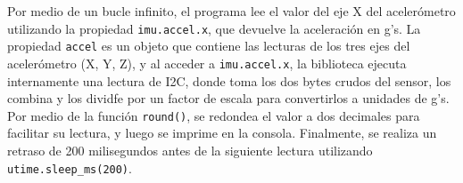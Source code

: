 \documentclass[letterpaper,12pt]{article}
\begin{document}
    Por medio de un bucle infinito, el programa lee el valor del eje X del acelerómetro utilizando la propiedad \texttt{imu.accel.x}, que devuelve la aceleración en g's. La propiedad \texttt{accel} es un objeto que contiene las lecturas de los tres ejes del acelerómetro (X, Y, Z), y al acceder a \texttt{imu.accel.x}, la biblioteca ejecuta internamente una lectura de I2C, donde toma los dos bytes crudos del sensor, los combina y los dividfe por un factor de escala para convertirlos a unidades de g's. Por medio de la función \texttt{round()}, se redondea el valor a dos decimales para facilitar su lectura, y luego se imprime en la consola. Finalmente, se realiza un retraso de 200 milisegundos antes de la siguiente lectura utilizando \texttt{utime.sleep\_ms(200)}.

    \newpage
\end{document}
